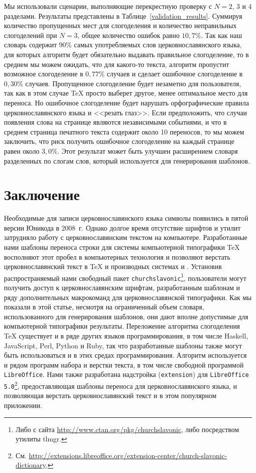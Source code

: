 \documentclass[12pt,a4paper,oneside]{extarticle}
\begin{document}
Мы использовали сценарии, выполняющие перекрестную проверку с $N = 2$, $3$ и $4$ разделами. Результаты представлены в Таблице~\ref{validation_results}. Суммируя количество пропущенных мест для слогоделения и количество неправильных слогоделений при  $N = 3$, общее количество ошибок равно $10,7\%$.  Так как наш словарь содержит $90\%$ самых употребляемых слов церковнославянского языка, для которых алгоритм будет обязательно выдавать правильное слогоделение, то в среднем мы можем ожидать, что для какого-то текста, алгоритм пропустит возможное слогоделение в $0,77\%$  случаев и сделает ошибочное слогоделение в $0,30\%$ случаев. Пропущенное слогоделение будет незаметно для пользователя, так как в этом случае \TeX{} просто выберет другое, менее оптимальное место для переноса. Но ошибочное слогоделение будет нарушать орфографические правила церковнославянского языка и <<резать глаз>>. Если предположить, что случаи появления слова на странице являются независимыми событиями, и что в среднем страница печатного текста содержит около 10 переносов, то мы можем заключить, что риск получить ошибочное слогоделение на каждый странице равен около $3,0\%$. Этот результат может быть улучшен расширением словаря разделенных по слогам слов, который используется для генерирования шаблонов.

\section{Заключение}

Необходимые для записи церковнославянского языка символы появились в пятой версии Юникода в 2008~г. Однако долгое время отсутствие шрифтов и утилит затрудняло работу с церковнославянским текстом на компьютере. Разработанные нами шаблоны переноса строки для системы компьютерной типографики \TeX{} восполняют этот пробел в компьютерных технология и позволяют верстать церковнославянский текст в \TeX{} и производных системах \XeTeX{} и \LuaTeX{}. Установив распространяемый нами свободный пакет \verb+churchslavonic+\footnote{Либо с сайта \url{http://www.ctan.org/pkg/churchslavonic}, либо посредством утилиты tlmgr.}, пользователи могут получить доступ к церковнославянским шрифтам, разработанным шаблонам и ряду дополнительных макрокоманд для церковнославянской типографики. Как мы показали в этой статье, несмотря на ограниченный объем словаря, использованного для генерирования шаблонов, они дают вполне допустимые для компьютерной типографики результаты. Переложение алгоритма слогоделения \TeX{}  существует и в ряде других языков программирования, в том числе Haskell, JavaScript, Perl, Python и Ruby, так что разработанные шаблоны также могут быть использоваться и в этих средах программирования. Алгоритм используется и рядом программ набора и верстки текста, в том числе свободной программой \verb+LibreOffice+. Нами также разработана надстройка (\verb+extension+) для \verb+LibreOffice 5.0+\footnote{См. \url{http://extensions.libreoffice.org/extension-center/church-slavonic-dictionary}.}, предоставляющая шаблоны переноса для церковнославянского языка, и позволяющая верстать церковнославянский текст и в этом популярном приложении.

\printbibliography
\end{document}
